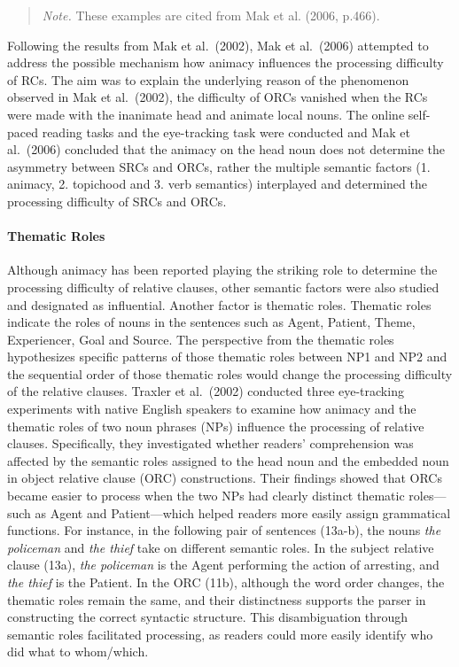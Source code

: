 \documentclass[
]{article}
\begin{document}
\vspace{1em}

\noindent
\begin{quote}
\small
\textit{Note.} These examples are cited from Mak et al. (2006, p.466).
\end{quote}

\vspace{1em}

Following the results from Mak et al.~(2002), Mak et al.~(2006)
attempted to address the possible mechanism how animacy influences the
processing difficulty of RCs. The aim was to explain the underlying
reason of the phenomenon observed in Mak et al.~(2002), the difficulty
of ORCs vanished when the RCs were made with the inanimate head and
animate local nouns. The online self-paced reading tasks and the
eye-tracking task were conducted and Mak et al.~(2006) concluded that
the animacy on the head noun does not determine the asymmetry between
SRCs and ORCs, rather the multiple semantic factors (1. animacy, 2.
topichood and 3. verb semantics) interplayed and determined the
processing difficulty of SRCs and ORCs.

\paragraph{Thematic Roles}\label{thematic-roles}

Although animacy has been reported playing the striking role to
determine the processing difficulty of relative clauses, other semantic
factors were also studied and designated as influential. Another factor
is thematic roles. Thematic roles indicate the roles of nouns in the
sentences such as Agent, Patient, Theme, Experiencer, Goal and Source.
The perspective from the thematic roles hypothesizes specific patterns
of those thematic roles between NP1 and NP2 and the sequential order of
those thematic roles would change the processing difficulty of the
relative clauses. Traxler et al.~(2002) conducted three eye-tracking
experiments with native English speakers to examine how animacy and the
thematic roles of two noun phrases (NPs) influence the processing of
relative clauses. Specifically, they investigated whether readers'
comprehension was affected by the semantic roles assigned to the head
noun and the embedded noun in object relative clause (ORC)
constructions. Their findings showed that ORCs became easier to process
when the two NPs had clearly distinct thematic roles---such as Agent and
Patient---which helped readers more easily assign grammatical functions.
For instance, in the following pair of sentences (13a-b), the nouns
\emph{the policeman} and \emph{the thief} take on different semantic
roles. In the subject relative clause (13a), \emph{the policeman} is the
Agent performing the action of arresting, and \emph{the thief} is the
Patient. In the ORC (11b), although the word order changes, the thematic
roles remain the same, and their distinctness supports the parser in
constructing the correct syntactic structure. This disambiguation
through semantic roles facilitated processing, as readers could more
easily identify who did what to whom/which.
\end{document}
